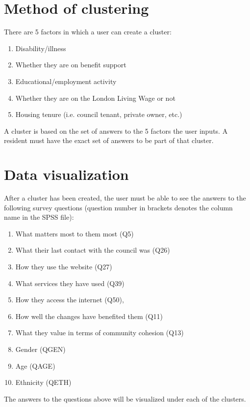 \section{Method of clustering} \label{method_clustering}
There are 5 factors in which a user can create a cluster:
\begin{enumerate}
	\item Disability/illness
	\item Whether they are on benefit support
	\item Educational/employment activity
	\item Whether they are on the London Living Wage or not
	\item Housing tenure (i.e. council tenant, private owner, etc.)
\end{enumerate}

A cluster is based on the set of answers to the 5 factors the user inputs. A resident must have the exact set of answers to be part of that cluster.

\section{Data visualization} \label{data_visualization}
After a cluster has been created, the user must be able to see the answers to the following survey questions (question number in brackets denotes the column name in the SPSS file):
\begin{enumerate}
	\item What matters most to them most (Q5)
	\item What their last contact with the council was (Q26)
	\item How they use the website (Q27)
	\item What services they have used (Q39)
	\item How they access the internet (Q50),
	\item How well the changes have benefited them (Q11)
	\item What they value in terms of community cohesion (Q13) 
	\item Gender (QGEN)
	\item Age (QAGE)
	\item Ethnicity (QETH)
\end{enumerate}

The answers to the questions above will be visualized under each of the clusters. 

